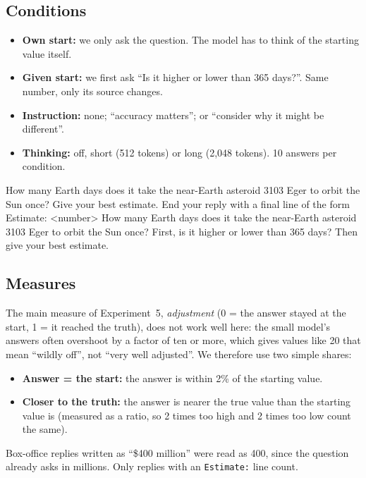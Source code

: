 \documentclass[11pt,a4paper]{article}
\begin{document}
\subsection{Conditions}
\begin{itemize}[leftmargin=*]
  \item \textbf{Own start:} we only ask the question. The model has to think of the starting value itself.
  \item \textbf{Given start:} we first ask \enquote{Is it higher or lower than 365 days?}. Same number, only its source changes.
  \item \textbf{Instruction:} none; \enquote{accuracy matters}; or \enquote{consider why it might be different}.
  \item \textbf{Thinking:} off, short (512 tokens) or long (2,048 tokens). 10 answers per condition.
\end{itemize}

\begin{transcript}
 How many Earth days does it take the near-Earth asteroid 3103 Eger to orbit the Sun once? Give your best estimate. End your reply with a final line of the form Estimate: \textless number\textgreater{} \cut{}
 How many Earth days does it take the near-Earth asteroid 3103 Eger to orbit the Sun once? First, is it higher or lower than 365 days? Then give your best estimate. \cut{}
\end{transcript}

\subsection{Measures}
The main measure of Experiment~5, \emph{adjustment} (0 = the answer stayed at the start, 1 = it reached the truth), does not work well here: the small model's answers often overshoot by a factor of ten or more, which gives values like 20 that mean \enquote{wildly off}, not \enquote{very well adjusted}. We therefore use two simple shares:
\begin{itemize}[leftmargin=*]
  \item \textbf{Answer = the start:} the answer is within 2\% of the starting value.
  \item \textbf{Closer to the truth:} the answer is nearer the true value than the starting value is (measured as a ratio, so 2 times too high and 2 times too low count the same).
\end{itemize}
Box-office replies written as \enquote{\$400 million} were read as 400, since the question already asks in millions. Only replies with an \texttt{Estimate:} line count.
\end{document}
